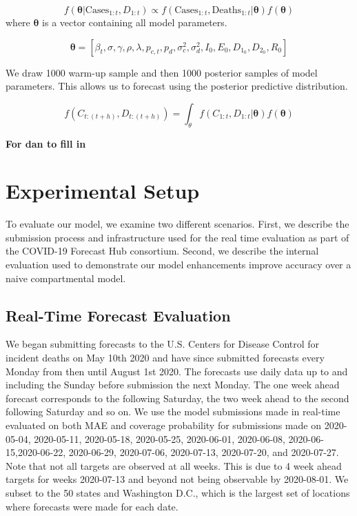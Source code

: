 \documentclass{umassthesis}          %
\begin{document}
\begin{equation}
f(\bm{\theta} | \text{Cases}_{1:t},D_{1:t}) \propto f(\text{Cases}_{1:t},\text{Deaths}_{1:t} | \bm{\theta})f(\bm{\theta})
\end{equation}
where $\bm{\theta}$ is a vector containing all model parameters. 

\begin{equation}
\bm{\theta} =[\beta_{t} ,
\sigma ,
\gamma ,
\rho ,
\lambda ,
p_{c,t} ,
p_{d} ,
\sigma_c^2 ,
\sigma_d^2 ,
I_0 ,
E_0 ,
D_{1_0} ,
D_{2_0} ,
R_0 ]
\end{equation}

We draw 1000 warm-up sample and then 1000 posterior samples of model parameters. This allows us to forecast using the posterior predictive distribution.

\begin{equation}
f(C_{t:(t+h)}, D_{t:(t+h)}) =  \int_{\theta} f(C_{1:t},D_{1:t} | \bm{\theta})f(\bm{\theta})
\end{equation}

\textbf{For dan to fill in}
 \section{Experimental Setup}
 To evaluate our model, we examine two different scenarios. First, we describe the submission process and infrastructure used for the real time evaluation as part of the COVID-19 Forecast Hub consortium. Second, we describe the internal evaluation used to demonstrate our model enhancements improve accuracy over a naive compartmental model. 
 
 \subsection{Real-Time Forecast Evaluation}
We began submitting forecasts to the U.S. Centers for Disease Control for incident deaths on May 10th 2020 and have since submitted forecasts every Monday from then until August 1st 2020. The forecasts use daily data up to and including the Sunday before submission the next Monday. The one week ahead forecast corresponds to the following Saturday, the two week ahead to the second following Saturday and so on.  We use the model submissions made in real-time evaluated on both MAE and coverage probability for submissions made on 2020-05-04, 2020-05-11, 2020-05-18, 2020-05-25, 2020-06-01, 2020-06-08, 2020-06-15,2020-06-22, 2020-06-29, 2020-07-06, 2020-07-13, 2020-07-20, and 2020-07-27. Note that not all targets are observed at all weeks. This is due to 4 week ahead targets for weeks 2020-07-13 and beyond not being observable by 2020-08-01. We subset to the 50 states and Washington D.C., which is the largest set of locations where forecasts were made for each date. 
 
\end{document}
